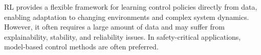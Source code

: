 \ac{RL} provides a flexible framework for learning control policies directly from data, enabling adaptation to changing environments and complex system dynamics. However, it often requires a large amount of data and may suffer from explainability, stability, and reliability issues. In safety-critical applications, model-based control methods are often preferred.

